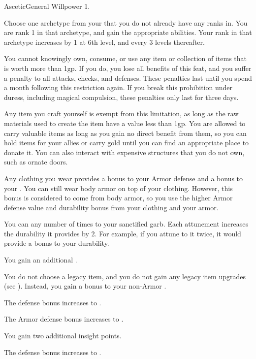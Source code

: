   \begin{feat}{Ascetic}{General}
    \featpre Willpower 1.

     Choose one archetype from your  that you do not already have any
    ranks in.
    You are rank 1 in that archetype, and gain the appropriate abilities.
    Your rank in that archetype increases by 1 at 6th level, and every 3 levels thereafter.

     You cannot knowingly own, consume, or use any item or collection of items that is worth more than 1gp.
    If you do, you lose all benefits of this feat, and you suffer a  penalty to all attacks, checks, and defenses.
    These penalties last until you spend a month following this restriction again.
    If you break this prohibition under duress, including magical compulsion, these penalties only last for three days.

    Any item you craft yourself is exempt from this limitation, as long as the raw materials used to create the item have a value less than 1gp.
    You are allowed to carry valuable items as long as you gain no direct benefit from them, so you can hold items for your allies or carry gold until you can find an appropriate place to donate it.
    You can also interact with expensive structures that you do not own, such as ornate doors.

     Any clothing you wear provides a  bonus to your Armor defense and a  bonus to your .
    You can still wear body armor on top of your clothing.
    However, this bonus is considered to come from body armor, so you use the higher Armor defense value and durability bonus from your clothing and your armor.

    You can  any number of times to your sanctified garb.
    Each attunement increases the durability it provides by 2.
    For example, if you attune to it twice, it would provide a  bonus to your durability.

     You gain an additional .

     You do not choose a legacy item, and you do not gain any legacy item upgrades (see ).
    Instead, you gain a  bonus to your non-Armor .

     The defense bonus increases to .

     The Armor defense bonus increases to .

     You gain two additional insight points.

     The defense bonus increases to .
  \end{feat}

